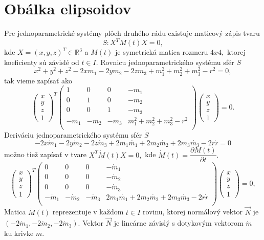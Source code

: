 \section{Obálka elipsoidov}
Pre jednoparametrické systémy plôch druhého rádu existuje maticový zápis tvaru 
$$
S: X^TM(t)X = 0,
$$
kde $ X = (x, y, z)^T \in \mathbb{R}^3 $ a $M(t) $ je symetrická matica rozmeru $4x4, $ ktorej koeficienty sú závislé od $t \in I$.
Rovnicu jednoparametrického systému sfér $S$
$$ x^2 +y^2 +z^2 -2xm_1 -2ym_2 - 2zm_3 + m_1^2 + m_2^2 + m_3^2 - r^2 =0
,$$
tak vieme zapísať ako
$$
\left(\begin{matrix} x \\ y \\ z  \\ 1
\end{matrix} \right)^T \left(\begin{matrix} 
1 & 0 & 0 & - m_1 \\
0 & 1 & 0 & - m_2 \\
0 & 0 & 1 & - m_3 \\
- m_1 & - m_2 & - m_3 &  m_1^2 + m_2^2 + m_3^2 - r^2 \\
\end{matrix} \right)\left(\begin{matrix} x \\ y \\ z \\ 1
\end{matrix} \right) = 0. 
$$
Deriváciu jednoparametrického systému sfér $\dot{S}$
$$
-2x\dot{m}_1 -2y\dot{m}_2 - 2z\dot{m}_3 + 2m_1\dot{m_1} + 2m_2\dot{m_2} + 2m_3\dot{m_3} - 2r\dot{r} = 0
$$
možno tiež zapísať v tvare  $X^T\dot{M}(t)X = 0,$
kde $\dot{M}(t)= \dfrac{\partial M(t)}{\partial t}.$
$$
\left(\begin{matrix} x \\ y \\ z  \\ 1
\end{matrix} \right)^T \left(\begin{matrix} 
0 & 0 & 0 & - \dot{m}_1 \\
0 & 0 & 0 & - \dot{m}_2 \\
0 & 0 & 0 & - \dot{m}_3 \\
- \dot{m}_1 & - \dot{m}_2 & - \dot{m}_3 &  2m_1\dot{m_1} + 2m_2\dot{m_2} + 2m_3\dot{m_3} - 2r\dot{r} \\
\end{matrix} \right)\left(\begin{matrix} x \\ y \\ z \\ 1
\end{matrix} \right) = 0,
$$
Matica $\dot{M}(t)$ reprezentuje v každom $t \in I $ rovinu, ktorej normálový vektor $\vec{N} $ je $(-2\dot{m}_1, -2\dot{m}_2, -2\dot{m}_3).$ Vektor $\vec{N}$ je lineárne závislý s dotykovým vektorom $\dot{m}$ ku krivke $m.$


